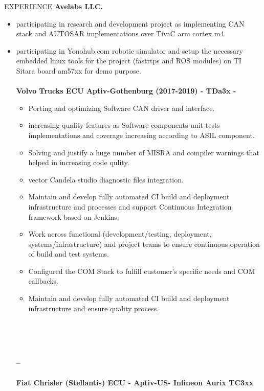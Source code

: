 \documentclass{resume} %
\begin{document}
\begin{rSection}{EXPERIENCE}
{\bf Avelabs LLC.}
\begin{itemize}
\setlength{\itemsep}{1pt}
  \setlength{\parskip}{0pt}
  \setlength{\parsep}{0pt}
    \item participating in research and development project as implementing CAN stack and AUTOSAR implementations over TivaC arm cortex m4.
     \item participating in Yonohub.com robotic simulator and setup the necessary embedded linux tools for the project (fastrtps and ROS modules) on TI Sitara board am57xx for demo purpose.
\\
\\{\bf Volvo Trucks ECU Aptiv-Gothenburg (2017-2019) - TDa3x - } 
\begin{itemize}
\setlength{\itemsep}{1pt}
  \setlength{\parskip}{0pt}
  \setlength{\parsep}{0pt}
    \item Porting and optimizing Software CAN driver and interface.
  \item increasing quality features as Software components unit tests implementations and coverage
increasing according to ASIL component.
\item Solving and justify a huge number of MISRA and compiler warnings that helped in increasing
code qulity.
\item vector Candela studio diagnostic files integration.
    \item Maintain and develop fully automated CI build and deployment infrastructure and processes and
support Continuous Integration framework based on Jenkins.
\item Work across functional (development/testing, deployment, systems/infrastructure) and project
teams to ensure continuous operation of build and test systems.
\item Configured the COM Stack to fulfill customer’s specific needs and COM callbacks.
    \item Maintain and develop fully automated CI build and deployment infrastructure and ensure quality process.
\end{itemize}
\\
\\
\\{\bf --\\
\\{\bf Fiat Chrisler (Stellantis) ECU} - Aptiv-US- Infineon Aurix TC3xx\\
\begin{itemize}
\setlength{\itemsep}{1pt}

\end{itemize}}
\end{itemize}
\end{rSection}
\end{document}
